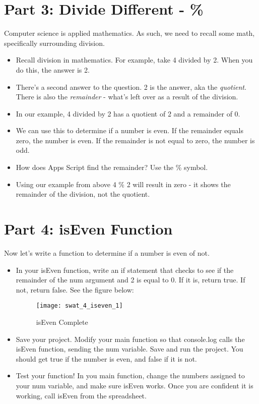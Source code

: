 \documentclass{article}
\begin{document}
\section*{Part 3: Divide Different - \%}
Computer science is applied mathematics.  As such, we need to recall some math, specifically surrounding division.
\begin{itemize}
	\item Recall division in mathematics.  For example, take 4 divided by 2.  When you do this, the answer is 2. 
	\item There's a second answer to the question.  2 is the answer, aka the \textit{quotient}.  There is also the \textit{remainder} - what's left over as a result of the division.
	\item In our example, 4 divided by 2 has a quotient of 2 and a remainder of 0.
	\item We can use this to determine if a number is even.  If the remainder equals zero, the number is even.  If the remainder is not equal to zero, the number is odd.
	\item How does Apps Script find the remainder?  Use the \% symbol.
	\item Using our example from above 4 \% 2 will result in zero - it shows the remainder of the division, not the quotient.
\end{itemize}

\section*{Part 4: isEven Function}
Now let's write a function to determine if a number is even of not.
\begin{itemize}
    \item In your isEven function, write an if statement that checks to see if the remainder of the num argument and 2 is equal to 0.  If it is, return true.  If not, return false.  See the figure below:
    \begin{figure}[H]
  		\centering
  		\texttt{[image: swat\_4\_iseven\_1]}
  		\caption{isEven Complete}
	\end{figure}
	\item Save your project.  Modify your main function so that console.log calls the isEven function, sending the num variable.  Save and run the project.  You should get true if the number is even, and false if it is not.
	\item Test your function!  In you main function, change the numbers assigned to your num variable, and make sure isEven works.  Once you are confident it is working, call isEven from the spreadsheet.
\end{itemize}
\end{document}
